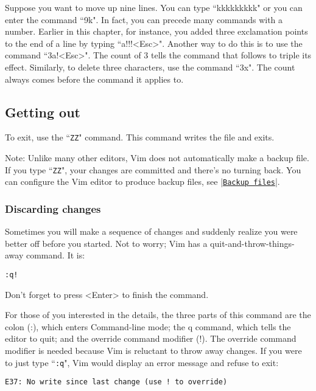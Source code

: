 Suppose you want to move up nine lines.
You can type ``kkkkkkkkk" or you can enter the command ``9k".
In fact, you can precede many commands with a number.
Earlier in this chapter, for instance, you added three exclamation points to the end of a line by typing ``a!!!<Esc>".
Another way to do this is to use the command ``3a!<Esc>".
The count of 3 tells the command that follows to triple its effect.
Similarly, to delete three characters, use the command ``3x".
The count always comes before the command it applies to.

\subsection{Getting out}

To exit, use the ``\texttt{ZZ}" command.  This command writes the file and exits.

Note:\newline
Unlike many other editors, Vim does not automatically make a backup file.
If you type ``\texttt{ZZ}", your changes are committed and there's no turning back.
You can configure the Vim editor to produce backup files, see |\hyperref[Backup files]{\texttt{Backup files}}|.

\subsubsection{Discarding changes}

Sometimes you will make a sequence of changes and suddenly realize you were better off before you started.
Not to worry; Vim has a quit-and-throw-things-away command.
It is: 

	\begin{Verbatim}[samepage=true]
	:q!
	\end{Verbatim}

Don't forget to press <Enter> to finish the command.

For those of you interested in the details, the three parts of this command are the colon (:), which enters Command-line mode; the q command, which tells the editor to quit; and the override command modifier (!).
The override command modifier is needed because Vim is reluctant to throw away changes.
If you were to just type ``\texttt{:q}", Vim would display an error message and refuse to exit: 

		\begin{Verbatim}[samepage=true]
    E37: No write since last change (use ! to override) 
		\end{Verbatim}

